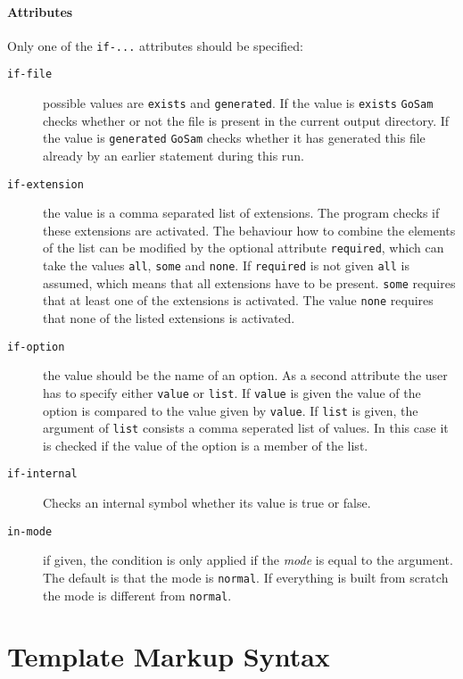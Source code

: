 \documentclass[11pt,a4paper]{refrep}
\newcommand{\golem}{{\tt GoSam}\xspace}
\begin{document}
\paragraph{Attributes}
Only one of the \texttt{if-...} attributes should be specified:
\begin{description}
\item[\texttt{if-file}] possible values are \texttt{exists} and
\texttt{generated}. If the value is \texttt{exists} \golem{} checks
whether or not the file is present in the current output directory.
If the value is \texttt{generated} \golem{} checks whether it has
generated this file already by an earlier statement during this run.
\item[\texttt{if-extension}] the value is a comma separated list of
extensions. The program checks if these extensions are activated.
The behaviour how to combine the elements of the list
can be modified by the optional attribute
\texttt{required}, which can take the values \texttt{all}, \texttt{some}
and \texttt{none}. If \texttt{required} is not given \texttt{all} is assumed,
which means that all extensions have to be present. \texttt{some} requires
that at least one of the extensions is activated. The value \texttt{none}
requires that none of the listed extensions is activated.
\item[\texttt{if-option}] the value should be the name of an option.
As a second attribute the user has to specify either \texttt{value}
or \texttt{list}. If \texttt{value} is given the value of the option
is compared to the value given by \texttt{value}. If \texttt{list} is
given, the argument of \texttt{list} consists a comma seperated list
of values. In this case it is checked if the value of the option is
a member of the list.
\item[\texttt{if-internal}] Checks an internal symbol whether its value
is true or false.
\item[\texttt{in-mode}] if given, the condition is only applied if the
\emph{mode} is equal to the argument. The default is that the mode is
\texttt{normal}. If everything is built from scratch  the mode is
different from \texttt{normal}.

\end{description}

\section{Template Markup Syntax}
\lstset{language=[fortran]gosamt}
\end{document}
